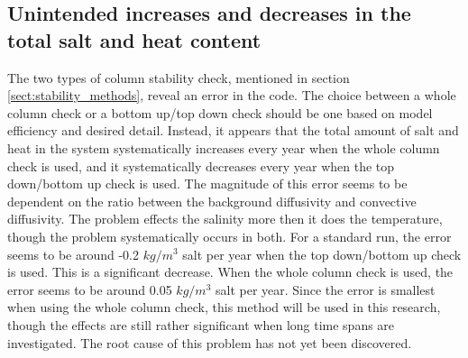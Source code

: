 \documentclass[twocolumn]{article}
\begin{document}
\subsection{Unintended increases and decreases in the total salt and heat content}
\label{sect:totals_problem}
The two types of column stability check, mentioned in section \ref{sect:stability_methods}, reveal an error in the code. The choice between a whole column check or a bottom up/top down check should be one based on model efficiency and desired detail. Instead, it appears that the total amount of salt and heat in the system systematically increases every year when the whole column check is used, and it systematically decreases every year when the top down/bottom up check is used. The magnitude of this error seems to be dependent on the ratio between the background diffusivity and convective diffusivity. The problem effects the salinity more then it does the temperature, though the problem systematically occurs in both. 
For a standard run, the error seems to be around -0.2 $kg/m^3$ salt per year when the top down/bottom up check is used. This is a significant decrease. When the whole column check is used, the error seems to be around 0.05 $kg/m^3$ salt per year. Since the error is smallest when using the whole column check, this method will be used in this research, though the effects are still rather significant when long time spans are investigated. The root cause of this problem has not yet been discovered. 

\FloatBarrier
\end{document}
